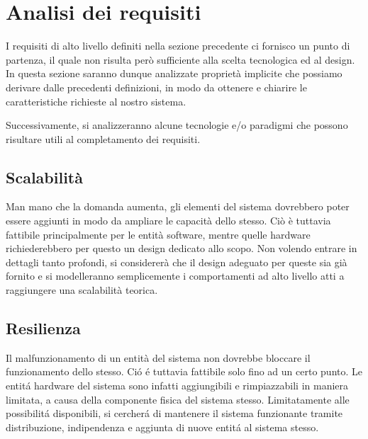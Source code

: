\section{Analisi dei requisiti}

I requisiti di alto livello definiti nella sezione precedente ci fornisco un punto di partenza, il quale non risulta però sufficiente alla scelta tecnologica ed al design. In questa sezione saranno dunque analizzate proprietà implicite che possiamo derivare dalle precedenti definizioni, in modo da ottenere e chiarire le caratteristiche richieste al nostro sistema.

\parag
Successivamente, si analizzeranno alcune tecnologie e/o paradigmi che possono risultare utili al completamento dei requisiti.

\subsection{Scalabilità}
Man mano che la domanda aumenta, gli elementi del sistema dovrebbero poter essere aggiunti in modo da ampliare le capacità dello stesso. Ciò è tuttavia fattibile principalmente per le entità software, mentre quelle hardware richiederebbero per questo un design dedicato allo scopo. Non volendo entrare in dettagli tanto profondi, si considererà che il design adeguato per queste sia già fornito e si modelleranno semplicemente i comportamenti ad alto livello atti a raggiungere una scalabilità teorica.

\subsection{Resilienza}
Il malfunzionamento di un entità del sistema non dovrebbe bloccare il funzionamento dello stesso. Ci\'o \'e tuttavia fattibile solo fino ad un certo punto. Le entit\'a hardware del sistema sono infatti aggiungibili e rimpiazzabili in maniera limitata, a causa della componente fisica del sistema stesso. Limitatamente alle possibilit\'a disponibili, si cercher\'a di mantenere il sistema funzionante tramite distribuzione, indipendenza e aggiunta di nuove entit\'a al sistema stesso.

